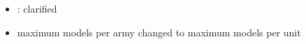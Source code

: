 

\subtitle{2023 beta 1 hotfix 1}


\begin{itemize}
	\item \fetthisfleshmaster: clarified
	\item \giantrats{} maximum models per army changed to maximum models per unit
\end{itemize}

%
%
